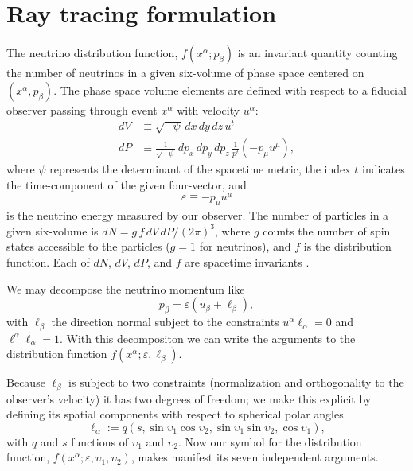 \documentclass[aps,floatfix,prd,superscriptaddress,twocolumn]{revtex4-1}
\begin{document}
\section{Ray tracing formulation}
\label{sec:formulation}
The neutrino distribution function, $f(x^\alpha; p_\beta)$ is an invariant
quantity counting the number of neutrinos in a given six-volume of phase
space centered on $(x^\alpha,p_\beta)$.
The phase space volume elements are defined with respect to a fiducial
observer passing through event $x^\alpha$ with velocity $u^\alpha$:
\begin{align}
  \label{eqn:dV}
  dV & \equiv \sqrt{-\psi} \, dx \, dy \, dz \, u^t \\
  \label{eqn:dP}
  dP & \equiv \frac{1}{\sqrt{-\psi}} \, dp_x \, dp_y \, dp_z \,
  \frac{1}{p^t}(-p_\mu u^\mu),
\end{align}
where $\psi$ represents the determinant of the spacetime metric,
the index $t$ indicates the time-component of the given four-vector, and
\begin{equation}
  \label{eqn:varepsilon}
  \varepsilon \equiv -p_\mu u^\mu
\end{equation}
is the neutrino energy measured by our observer.
The number of particles in a given six-volume is
$dN=g\,f\,dV\,dP/(2\pi)^3$,
where $g$ counts the number of spin states accessible to the
particles ($g=1$ for neutrinos), and $f$ is the distribution function.
Each of $dN$, $dV$, $dP$, and $f$ are spacetime invariants
\citep{debb2009-gr_boltzmann_1, debb2009-gr_boltzmann_2, lind1966-gr_boltzmann}.

We may decompose the neutrino momentum like
\begin{equation}
  \label{eqn:def_momentum}
  p_\beta = \varepsilon (u_\beta + \ell_\beta),
\end{equation}
with $\ell_\beta$ the direction normal subject to the constraints
$u^\alpha \ell_\alpha = 0$ and $\ell^\alpha \ell_\alpha=1$.
With this decompositon we can write the arguments to the distribution function
$f(x^\alpha;\varepsilon,\ell_\beta)$.

Because $\ell_\beta$ is subject to two constraints
(normalization and orthogonality to the observer's velocity)
it has two degrees of freedom; we make this explicit by defining its
spatial components with respect to spherical polar angles
\begin{equation}
  \label{eqn:def_direction}
  \ell_\alpha :=
  q (s,\sin\upsilon_1\cos\upsilon_2,\sin\upsilon_1\sin\upsilon_2,\cos\upsilon_1),
\end{equation}
with $q$ and $s$ functions of $\upsilon_1$ and $\upsilon_2$.
Now our symbol for the distribution function,
$f(x^\alpha;\varepsilon,\upsilon_1,\upsilon_2)$,
makes manifest its seven independent arguments.
\end{document}
